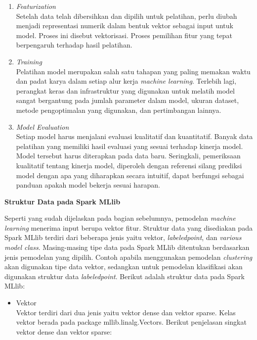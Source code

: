 \documentclass[a4paper,twoside]{article}
\begin{document}
\begin{enumerate}
\begin{enumerate}

\item \textit{Featurization}\\
Setelah data telah dibersihkan dan dipilih untuk pelatihan, perlu diubah menjadi representasi numerik dalam bentuk vektor sebagai input untuk model. Proses ini disebut vektorisasi. Proses pemilihan fitur yang tepat berpengaruh terhadap hasil pelatihan.
 
\item \textit{Training}\\
Pelatihan model merupakan salah satu tahapan yang paling memakan waktu dan padat karya dalam setiap alur kerja \textit{machine learning}. Terlebih lagi, perangkat keras dan infrastruktur yang digunakan untuk melatih model sangat bergantung pada jumlah parameter dalam model, ukuran dataset, metode pengoptimalan yang digunakan, dan pertimbangan lainnya.

\item \textit{Model Evaluation}\\
Setiap model harus menjalani evaluasi kualitatif dan kuantitatif. Banyak data pelatihan yang memiliki hasil evaluasi yang sesuai terhadap kinerja model. Model tersebut harus diterapkan pada data baru. Seringkali, pemeriksaan kualitatif tentang kinerja model, diperoleh dengan referensi silang prediksi model dengan apa yang diharapkan secara intuitif, dapat berfungsi sebagai panduan apakah model bekerja sesuai harapan.
\end{enumerate}

\textbf{Struktur Data pada Spark MLlib}

Seperti yang sudah dijelaskan pada bagian sebelumnya, pemodelan \textit{machine learning} menerima input berupa vektor fitur. Struktur data yang disediakan pada Spark MLlib terdiri dari beberapa jenis yaitu vektor, \textit{labeledpoint}, dan \textit{various model class}. Masing-masing tipe data pada Spark MLlib ditentukan berdasarkan jenis pemodelan yang dipilih. Contoh apabila menggunakan pemodelan \textit{clustering} akan digunakan tipe data vektor, sedangkan untuk pemodelan klasifikasi akan digunakan struktur data \textit{labeledpoint}. Berikut adalah struktur data pada Spark MLlib:

\begin{itemize}
\item Vektor\\
Vektor terdiri dari dua jenis yaitu vektor dense dan vektor sparse. Kelas vektor berada pada package mllib.linalg.Vectors. Berikut penjelasan singkat vektor dense dan vektor sparse:


\end{itemize}
\end{enumerate}
\end{document}
